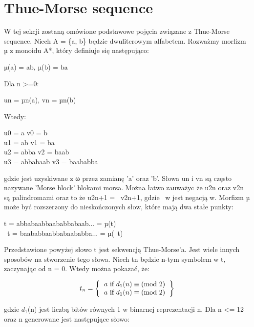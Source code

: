 \documentclass[document]{xmgr}
\begin{document}
\section{Thue-Morse sequence}
W tej sekcji zostaną omówione podstawowe pojęcia związane z Thue-Morse sequence.
Niech A = \{a, b\} będzie dwuliterowym alfabetem. Rozważmy morfizm µ z monoidu A*, który definiuje się następująco:
\begin{center}
µ(a) = ab,					µ(b) = ba
\end{center}
Dla n >=0:
\begin{center}
un = µn(a),				vn = µn(b)
\end{center}
Wtedy:		
\begin{center}
u0 = a 					v0 = b\\
u1 = ab					v1 = ba\\
u2 = abba				v2 = baab\\
u3 = abbabaab			v3 = baababba
\end{center}
gdzie  jest uzyskiwane z ω przez zamianę 'a' oraz 'b'. Słowa un i vn są często nazywane 'Morse block' blokami morsa. Można łatwo zauważyc że u2n oraz v2n są palindromami oraz to że u2n+1 = ~v2n+1, gdzie ~w jest negacją w. Morfizm µ może być rozszerzony do nieskończonych słow, które mają dwa stałe punkty:
\begin{center}
t = abbabaabbaababbabaab... = µ(t)\\
~t = baababbaabbabaababba... = µ(~t)
\end{center}
Przedstawione powyżej słowo t jest sekwencją Thue-Morse'a. Jest wiele innych sposobów na stworzenie tego słowa. Niech tn będzie n-tym symbolem w t, zaczynając od n = 0. Wtedy można pokazać, że:

\[
t_n=
\left \{
\begin{tabular}{ccc}
$a\ \textrm{if}\ d_1(n) \equiv (\textrm{mod}\ 2)$ \\
$a\ \textrm{if}\ d_1(n) \equiv (\textrm{mod}\ 2)$
\end{tabular}
\right \}
\]

gdzie $d_1$(n) jest liczbą bitów równych 1 w binarnej reprezentacji n. Dla n <= 12 oraz n generowane jest następujące słowo:
\end{document}
